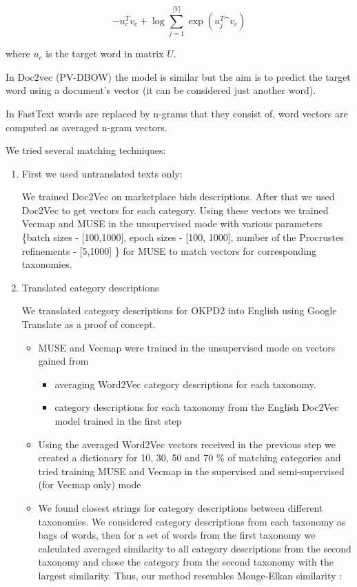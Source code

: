 \documentclass[conference]{IEEEtran}
\begin{document}
$$-u_c^Tv_c + \log \sum_{j=1}^{|V|}\exp(u_j^T \^{v_c})$$

where $u_c$ is the target word in matrix $U$.

In Doc2vec (PV-DBOW) the model is similar but the aim is to predict the target word using a document's vector (it can be considered just another word).

In FastText words are replaced by n-grams that they consist of, word vectors are computed as averaged n-gram vectors.

We tried several matching techniques:
\begin{enumerate}
\item First we used untranslated texts only:

We trained Doc2Vec on marketplace bids descriptions. After that we used Doc2Vec to get vectors for each category. Using these vectors we trained Vecmap and MUSE in the unsupervised mode with various parameters \{batch sizes - [100,1000], epoch sizes - [100, 1000], number of the Procrustes refinements - [5,1000] \} for MUSE to match vectors for corresponding taxonomies.

\item Translated category descriptions

We translated category descriptions for OKPD2 into English using Google Translate as a proof of concept.
\begin{itemize}
\item MUSE and Vecmap were trained in the unsupervised mode on vectors gained from \begin{itemize}
    \item averaging Word2Vec category descriptions for each taxonomy.
    \item category descriptions for each taxonomy from the English Doc2Vec model trained in the first step
    \end{itemize}
\item Using the averaged Word2Vec vectors received in the previous step we created a dictionary for 10, 30, 50 and 70 \% of matching categories and tried training MUSE and Vecmap in the supervised and semi-supervised (for Vecmap only) mode
\item We found closest strings for category descriptions between different taxonomies. We considered category descriptions from each taxonomy as bags of words, then for a set of words from the first taxonomy we calculated averaged similarity to all category descriptions from the second taxonomy and chose the category from the second taxonomy with the largest similarity. Thus, our method resembles Monge-Elkan similarity \cite[p.~111]{dupe-detect}:
\end{itemize}


\end{enumerate}
\end{document}
